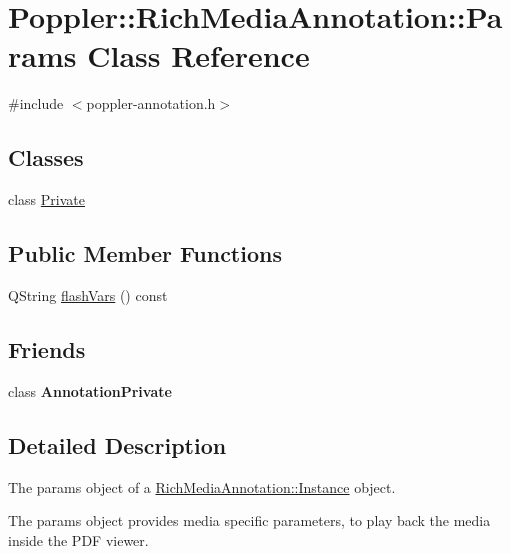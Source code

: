 \hypertarget{class_poppler_1_1_rich_media_annotation_1_1_params}{}\section{Poppler\+:\+:Rich\+Media\+Annotation\+:\+:Params Class Reference}
\label{class_poppler_1_1_rich_media_annotation_1_1_params}


{\ttfamily \#include $<$poppler-\/annotation.\+h$>$}

\subsection*{Classes}
\begin{DoxyCompactItemize}
\item 
class \hyperlink{class_poppler_1_1_rich_media_annotation_1_1_params_1_1_private}{Private}
\end{DoxyCompactItemize}
\subsection*{Public Member Functions}
\begin{DoxyCompactItemize}
\item 
Q\+String \hyperlink{class_poppler_1_1_rich_media_annotation_1_1_params_a9f8246894a1fe172f8bb546f7282167e}{flash\+Vars} () const
\end{DoxyCompactItemize}
\subsection*{Friends}
\begin{DoxyCompactItemize}
\item 
\mbox{\label{class_poppler_1_1_rich_media_annotation_1_1_params_add0bc3e32e560f9e9eb3025587c1ad54}} 
class {\bfseries Annotation\+Private}
\end{DoxyCompactItemize}


\subsection{Detailed Description}
The params object of a \hyperlink{class_poppler_1_1_rich_media_annotation_1_1_instance}{Rich\+Media\+Annotation\+::\+Instance} object.

The params object provides media specific parameters, to play back the media inside the P\+DF viewer.

